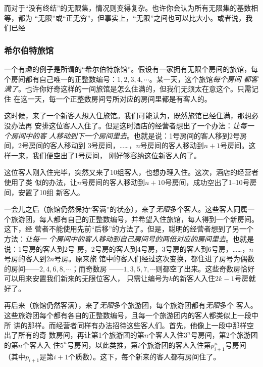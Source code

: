 而对于“没有终结”的无限集，情况则变得复杂。也许你会认为所有无限集的基数相等，都为
“无限”或“正无穷”，但事实上，“无限”之间也可以比大小。或者说，我们已经

\subsubsection{希尔伯特旅馆}

一个有趣的例子是所谓的“希尔伯特旅馆”。假设有一家拥有无限个房间的旅馆，每
个房间都有自己唯一的正整数编号：$1,2,3,4,\cdots $。某一天，这个旅馆\emph{每个房间
都客满了}。也许你好奇这样的一间旅馆是怎么住满的，但我们无须太在意这个。只需记住
在这一天，每一个正整数房间号所对应的房间里都是有客人的。

这时候，来了一个新客人想入住旅馆。我们可能认为，既然旅馆已经住满，那想必没办法再
安排这位客人入住了。但是这时酒店的经营者想出了一个办法：\emph{让每一个房间中的客
人移动到下一个房间里去}。也就是说：1号房间的客人移到2号房间，2号房间的客人移动到
3号房间，……，$n$号房间的客人移动到$n+1$号房间。这样一来，我们便空出了1号房间，
刚好够容纳这位新客人的了。

这位客人刚入住完毕，突然又来了10组客人，也想办理入住。这次，酒店的经营者使用了类
似的办法，让$n$号房间的客人移动到$n+10$号房间，成功空出了1--10号房间，安置了10组
新客人。

一会儿之后（旅馆仍然保持“客满”的状态），来了\emph{无限}多个客人。这些客人同属一
个旅游团，每人都有自己的正整数编号，并希望入住旅馆，每人得到一个新房间。这下，经
营者不能使用先前“后移”的方法了。但是，聪明的经营者想到了另一个方法：\emph{让每一
个房间中的客人移动到自己房间号的两倍对应的房间里去}。也就是说：1号房的客人到2号
房，2号房的客人到4号房，3号房的客人到6号房，……，$n$号房的客人到$2n$号房。原来旅
馆中的客人们经过这次变换，都住进了房号为偶数的房间——$2,4,6,8,\cdots $；而奇数房
——$1,3,5,7,\cdots $则都空了出来。这些奇数房恰好可以用来安置我们新来的无限位客人，
只需让编号为$k$的新客人入住$2k-1$号房就好了。

再后来（旅馆仍然客满），来了\emph{无限}多个旅游团，每个旅游团都有\emph{无限}多个
客人。这些旅游团每个都有各自的正整数编号，且每一个旅游团内的客人都类似上一段中所
讲的那样。而经营者同样有办法招待这些客人们。首先，他像上一段中那样空出了所有的奇
数房间，再让第1个旅游团的第$n$个客人入住$3^n$号房间，第2个旅游团的第$n$个客人入
住$5^n$号房间，以此类推，第$i$个旅游团的客人入住第$p_{i+1}^n$号房间（其中$p_{i+1}
$是第$i+1$个质数）。这下，每个新来的客人都有房间住了。

\vspace{3ex}

